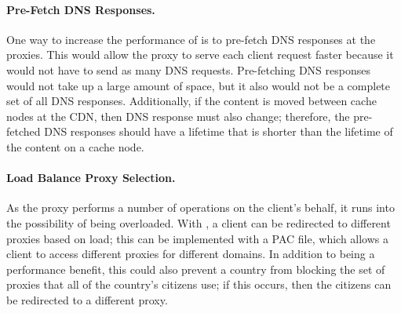 \paragraph{Pre-Fetch DNS Responses.} One way to increase the performance of \system{} is to pre-fetch DNS responses at 
the proxies.  This would allow the proxy to serve each client request faster because it would not have to send 
as many DNS requests.  Pre-fetching DNS responses would not take up a large amount of space, but it also 
would not be a complete set of all DNS responses.  Additionally, if the content is moved between cache nodes 
at the CDN, then DNS response must also change; therefore, the pre-fetched DNS responses should have a 
lifetime that is shorter than the lifetime of the content on a cache node.

\paragraph{Load Balance Proxy Selection.} As the proxy performs a number of operations on the client's behalf, it 
runs into the possibility of being overloaded.  With \system{}, a client can be redirected to different 
proxies based on load; this can be implemented with a PAC file, which allows 
a client to access different proxies for different domains.  In addition to being a performance benefit, 
this could also prevent a country from blocking the set of proxies that all of the country's citizens use; if 
this occurs, then the citizens can be redirected to a different proxy.   
